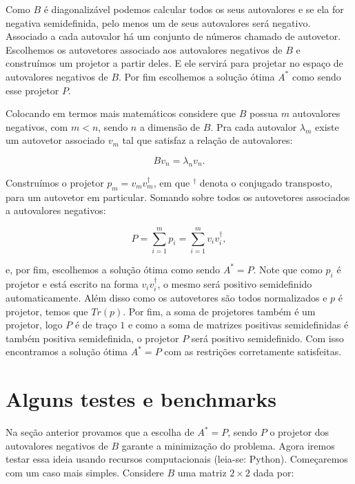 \documentclass[11pt]{article}
\begin{document}
Como \(B\) é diagonalizável podemos calcular todos os seus autovalores e
se ela for negativa semidefinida, pelo menos um de seus autovalores será
negativo. Associado a cada autovalor há um conjunto de números chamado
de autovetor. Escolhemos os autovetores associado aos autovalores
negativos de \(B\) e construímos um projetor a partir deles. E ele
servirá para projetar no espaço de autovalores negativos de \(B\). Por
fim escolhemos a solução ótima \(A^*\) como sendo esse projetor \(P\).

Colocando em termos mais matemáticos considere que \(B\) possua \(m\)
autovalores negativos, com \(m < n\), sendo \(n\) a dimensão de \(B\).
Pra cada autovalor \(\lambda_m\) existe um autovetor associado \(v_m\)
tal que satisfaz a relação de autovalores:

\begin{equation} Bv_n = \lambda_nv_n \label{eq2}. \tag{2} \end{equation}

Construímos o projetor \(p_m = v_mv^{\dagger}_m\), em que \(^{\dagger}\)
denota o conjugado transposto, para um autovetor em particular. Somando
sobre todos os autovetores associados a autovalores negativos:

\begin{equation} P = \sum_{i=1}^m p_i = \sum_{i=1}^m v_iv^{\dagger}_i, \label{eq3} \tag{3} \end{equation}

e, por fim, escolhemos a solução ótima como sendo \(A^* = P\). Note que
como \(p_i\) é projetor e está escrito na forma \(v_iv_i^{\dagger}\), o
mesmo será positivo semidefinido automaticamente. Além disso como os
autovetores são todos normalizados e \(p\) é projetor, temos que
\(Tr(p)\). Por fim, a soma de projetores também é um projetor, logo
\(P\) é de traço \(1\) e como a soma de matrizes positivas semidefinidas
é também positiva semidefinida, o projetor \(P\) será positivo
semidefinido. Com isso encontramos a solução ótima \(A^* = P\) com as
restrições corretamente satisfeitas.

    \hypertarget{alguns-testes-e-benchmarks}{%
\section{Alguns testes e benchmarks}\label{alguns-testes-e-benchmarks}}

    Na seção anterior provamos que a escolha de \(A^* = P\), sendo \(P\) o
projetor dos autovalores negativos de \(B\) garante a minimização do
problema. Agora iremos testar essa ideia usando recursos computacionais
(leia-se: Python). Começaremos com um caso mais simples. Considere \(B\)
uma matriz \(2\times 2\) dada por:
\end{document}
